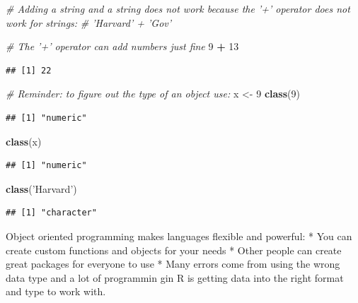 \documentclass[]{book}
\newenvironment{Shaded}{\begin{snugshade}}{\end{snugshade}}
\newcommand{\CommentTok}[1]{\textcolor[rgb]{0.56,0.35,0.01}{\textit{#1}}}
\newcommand{\DecValTok}[1]{\textcolor[rgb]{0.00,0.00,0.81}{#1}}
\newcommand{\KeywordTok}[1]{\textcolor[rgb]{0.13,0.29,0.53}{\textbf{#1}}}
\newcommand{\NormalTok}[1]{#1}
\newcommand{\OperatorTok}[1]{\textcolor[rgb]{0.81,0.36,0.00}{\textbf{#1}}}
\newcommand{\StringTok}[1]{\textcolor[rgb]{0.31,0.60,0.02}{#1}}
\theoremstyle{definition}
\theoremstyle{definition}
\theoremstyle{definition}
\theoremstyle{remark}
\begin{document}
\begin{Shaded}
\begin{Highlighting}[]
\CommentTok{# Adding a string and a string does not work because the '+' operator does not work for strings:}
\CommentTok{# 'Harvard' + 'Gov'}

\CommentTok{# The '+' operator can add numbers just fine}
\DecValTok{9} \OperatorTok{+}\StringTok{ }\DecValTok{13}
\end{Highlighting}
\end{Shaded}

\begin{verbatim}
## [1] 22
\end{verbatim}

\begin{Shaded}
\begin{Highlighting}[]
\CommentTok{# Reminder: to figure out the type of an object use:}
\NormalTok{x <-}\StringTok{ }\DecValTok{9}
\KeywordTok{class}\NormalTok{(}\DecValTok{9}\NormalTok{)}
\end{Highlighting}
\end{Shaded}

\begin{verbatim}
## [1] "numeric"
\end{verbatim}

\begin{Shaded}
\begin{Highlighting}[]
\KeywordTok{class}\NormalTok{(x)}
\end{Highlighting}
\end{Shaded}

\begin{verbatim}
## [1] "numeric"
\end{verbatim}

\begin{Shaded}
\begin{Highlighting}[]
\KeywordTok{class}\NormalTok{(}\StringTok{'Harvard'}\NormalTok{)}
\end{Highlighting}
\end{Shaded}

\begin{verbatim}
## [1] "character"
\end{verbatim}

Object oriented programming makes languages flexible and powerful:
* You can create custom functions and objects for your needs
* Other people can create great packages for everyone to use
* Many errors come from using the wrong data type and a lot of programmin gin R is getting data into the right format and type to work with.
\end{document}
